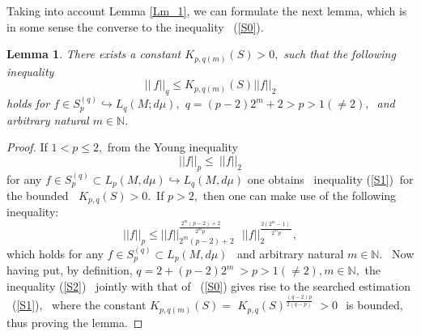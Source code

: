 \documentclass[pdflatex,sn-mathphys-num]{sn-jnl}%
\theoremstyle{thmstyleone}%
\newtheorem{lemma}[theorem]{Lemma}%
\theoremstyle{thmstyletwo}%
\theoremstyle{thmstylethree}%
\begin{document}
Taking into account Lemma \ref{Lm_1}, we can formulate the next lemma, which
is in some sense the converse to the inequality \ (\ref{S0}).

\begin{lemma}
	\label{Lm_2}There exists a constant $K_{p,q(m)}(S)>0,$ such that the
	following inequality 
	\begin{equation}
		||\ f||_{q}\leq K_{p,q(m)}(S) ||f||_{2}  \label{S1}
	\end{equation}%
	holds for $f\in S_{p}^{(q)}\hookrightarrow L_{q}(M;d\mu ),$ $%
	q=(p-2)2^{m}+2>p>1(\neq 2),\ $ and arbitrary natural $m\in \mathbb{N}.$
\end{lemma}

\begin{proof}
	If $1<p\leq 2,$ from the Young inequality 
	\begin{equation}
		||f||_{p}\leq \ ||f||_{2}  \label{S1a}
	\end{equation}%
	for any $f\in S_{p}^{(q)}\subset L_{p}(M,d\mu )\hookrightarrow L_{q}(M,d\mu
	) $ one obtains \ inequality (\ref{S1}) $\ $for the bounded $\ $ $%
	K_{p,q}(S)>0. $\ If $p>2,$ then  one can make use of the following
	inequality: \ 
	\begin{equation}
		||f||_{p}\leq ||f||_{2^{m}(p-2)+2}^{\frac{\ 2^{m}(p-2)+2}{2^{m}p}}\text{ }%
		||f||_{2}^{\frac{2(2^{m}-1)\ }{2^{m}p}},  \label{S2}
	\end{equation}%
	which holds for any $f\in S_{p}^{(q)}\subset L_{p}(M,d\mu )$ \ and arbitrary
	natural $m\in \mathbb{N}.$ \ Now having put, by definition, $q=2+(p-2)2^{m}\
	>p>1(\neq 2),m\in \mathbb{N},$ the inequality (\ref{S2}) \ jointly with that
	of \ (\ref{S0}) gives rise to the searched estimation \ (\ref{S1}), \ where
	the constant $K_{p,q(m)}(S)=$ $K_{p,q}(S)^{\frac{(q-2)p}{2(q-p)}}$ $>0\ $\
	is bounded, thus proving the lemma.  %
\end{proof}

\bigskip
\end{document}
